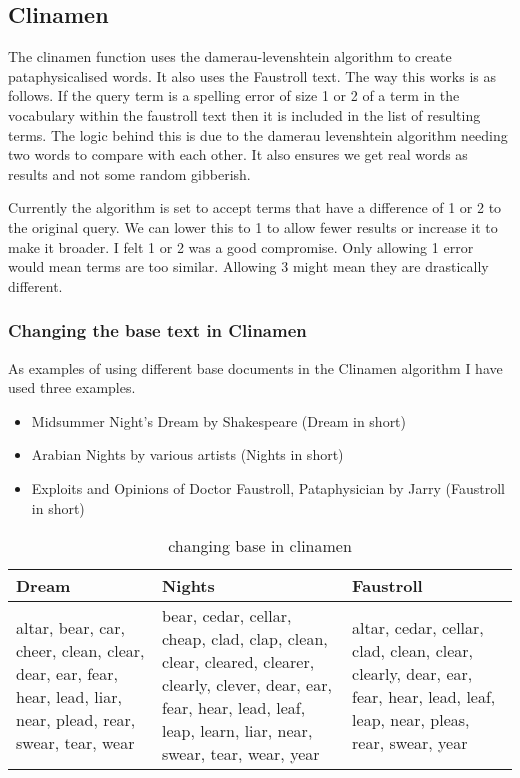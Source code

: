\subsection{Clinamen}

The clinamen function uses the damerau-levenshtein algorithm to create pataphysicalised words. It also uses the Faustroll text. The way this works is as follows. If the query term is a spelling error of size 1 or 2 of a term in the vocabulary within the faustroll text then it is included in the list of resulting terms. The logic behind this is due to the damerau levenshtein algorithm needing two words to compare with each other. It also ensures we get real words as results and not some random gibberish.

Currently the algorithm is set to accept terms that have a difference of 1 or 2 to the original query. We can lower this to 1 to allow fewer results or increase it to make it broader. I felt 1 or 2 was a good compromise. Only allowing 1 error would mean terms are too similar. Allowing 3 might mean they are drastically different.



\subsubsection{Changing the base text in Clinamen}

As examples of using different base documents in the Clinamen algorithm I have used three examples. 

\begin{itemize}
  \item Midsummer Night's Dream by Shakespeare (Dream in short)
  \item Arabian Nights by various artists (Nights in short)
  \item Exploits and Opinions of Doctor Faustroll, Pataphysician by Jarry (Faustroll in short)
\end{itemize}

\begin{table}
  \centering
  \begin{tabu}{X[l]X[1.5,l]X[l]}
  \toprule
  \textbf{Dream} & \textbf{Nights} & \textbf{Faustroll}\\
  \midrule
  altar, bear, car, cheer, clean, clear, dear, ear, fear, hear, lead, liar, near, plead, rear, swear, tear, wear & bear, cedar, cellar, cheap, clad, clap, clean, clear, cleared, clearer, clearly, clever, dear, ear, fear, hear, lead, leaf, leap, learn, liar, near, swear, tear, wear, year & altar, cedar, cellar, clad, clean, clear, clearly, dear, ear, fear, hear, lead, leaf, leap, near, pleas, rear, swear, year\\
  \bottomrule
  \end{tabu}
\caption[Changing base in clinamen]{changing base in clinamen}
\label{tab:baseclear}
\end{table}

